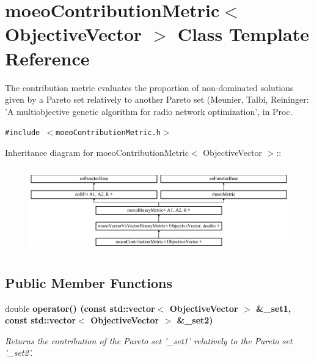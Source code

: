 \section{moeo\-Contribution\-Metric$<$ Objective\-Vector $>$ Class Template Reference}
\label{classmoeoContributionMetric}
The contribution metric evaluates the proportion of non-dominated solutions given by a Pareto set relatively to another Pareto set (Meunier, Talbi, Reininger: 'A multiobjective genetic algorithm for radio network optimization', in Proc.  


{\tt \#include $<$moeo\-Contribution\-Metric.h$>$}

Inheritance diagram for moeo\-Contribution\-Metric$<$ Objective\-Vector $>$::\begin{figure}[H]
\begin{center}
\leavevmode
\includegraphics[height=3.71353cm]{classmoeoContributionMetric}
\end{center}
\end{figure}
\subsection*{Public Member Functions}
\begin{CompactItemize}
\item 
double \bf{operator()} (const std::vector$<$ Objective\-Vector $>$ \&\_\-set1, const std::vector$<$ Objective\-Vector $>$ \&\_\-set2)
\begin{CompactList}\small\item\em Returns the contribution of the Pareto set '\_\-set1' relatively to the Pareto set '\_\-set2'. \item\end{CompactList}\end{CompactItemize}
